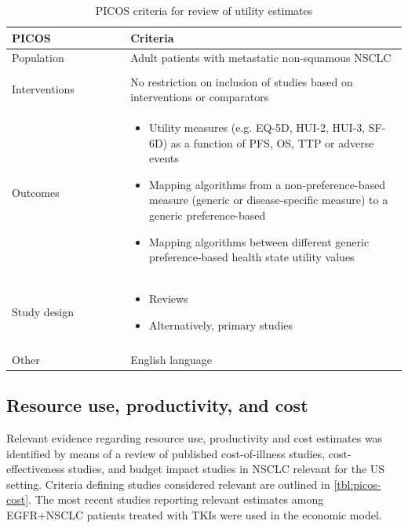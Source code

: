 \documentclass[11pt,final,fleqn]{article}\usepackage[]{graphicx}\usepackage[]{color}
\theoremstyle{plain}
\begin{document}
\begin{appendices}
\begin{table}[!ht]
\begin{center}
\begin{threeparttable}
\caption{PICOS criteria for review of utility estimates} \label{tbl:picos-utilities}
\begin{tabular}{p{0.3\linewidth}p{0.7\linewidth}}
\hline
\multicolumn{1}{l}{PICOS} &  \multicolumn{1}{l}{Criteria}\\
\hline
Population & Adult patients with metastatic non-squamous NSCLC\\
&\\
Interventions & No restriction on inclusion of studies based on interventions or comparators\\
Outcomes & 
\begin{itemize}
\item Utility measures (e.g. EQ-5D, HUI-2, HUI-3, SF-6D) as a function of PFS, OS, TTP or adverse events
\item Mapping algorithms from a non-preference-based measure (generic or disease-specific measure) to a generic preference-based
\item Mapping algorithms between different generic preference-based health state utility values
\end{itemize} \\
Study design & 
\begin{itemize}
\item Reviews
\item Alternatively, primary studies
\end{itemize} \\
&\\
Other & 
English language\\
\hline
\end{tabular}
\end{threeparttable}
\end{center}
\end{table}




\subsection{Resource use, productivity, and cost}
Relevant evidence regarding resource use, productivity and cost estimates was identified by means of a review of published cost-of-illness studies, cost-effectiveness studies, and budget impact studies in NSCLC relevant for the US setting. Criteria defining studies considered relevant are outlined in \autoref{tbl:picos-cost}. The most recent studies reporting relevant estimates among EGFR+NSCLC patients treated with TKIs were used in the economic model.


\end{appendices}
\end{document}
